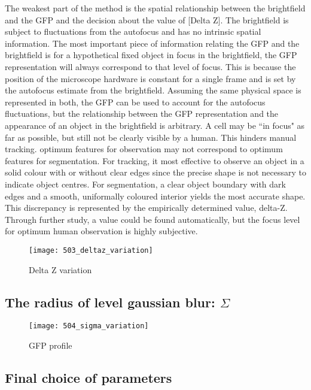 The weakest part of the method is the spatial relationship between the brightfield and the GFP and the decision about the value of [Delta Z]. The brightfield is subject to fluctuations from the autofocus and has no intrinsic spatial information. The most important piece of information relating the GFP and the brightfield is for a hypothetical fixed object in focus in the brightfield, the GFP representation will always correspond to that level of focus. This is because the position of the microscope hardware is constant for a single frame and is set by the autofocus estimate from the brightfield. Assuming the same physical space is represented in both, the GFP can be used to account for the autofocus fluctuations, but the relationship between the GFP representation and the appearance of an object in the brightfield is arbitrary. A cell may be ``in focus" as far as possible, but still not be clearly visible by a human. This hinders manual tracking. optimum features for observation may not correspond to optimum features for segmentation. For tracking, it most effective to observe an object in a solid colour with or without clear edges since the precise shape is not necessary to indicate object centres. For segmentation, a clear object boundary with dark edges and a smooth, uniformally coloured interior yields the most accurate shape. This discrepancy is represented by the empirically determined value, delta-Z. Through further study, a value could be found automatically, but the focus level for optimum human observation is highly subjective.

\begin{figure}[p]
 \centering
 \texttt{[image: 503\_deltaz\_variation]}
 \caption{
 	Delta Z variation
 }
 \label{fig:deltazvariation}
\end{figure}

\subsection{The radius of level gaussian blur: $\Sigma$}



\begin{figure}[p]
 \centering
 \texttt{[image: 504\_sigma\_variation]}
 \caption{
 	GFP profile
 }
 \label{fig:sigmavariation}
\end{figure}

\subsection{Final choice of parameters}

